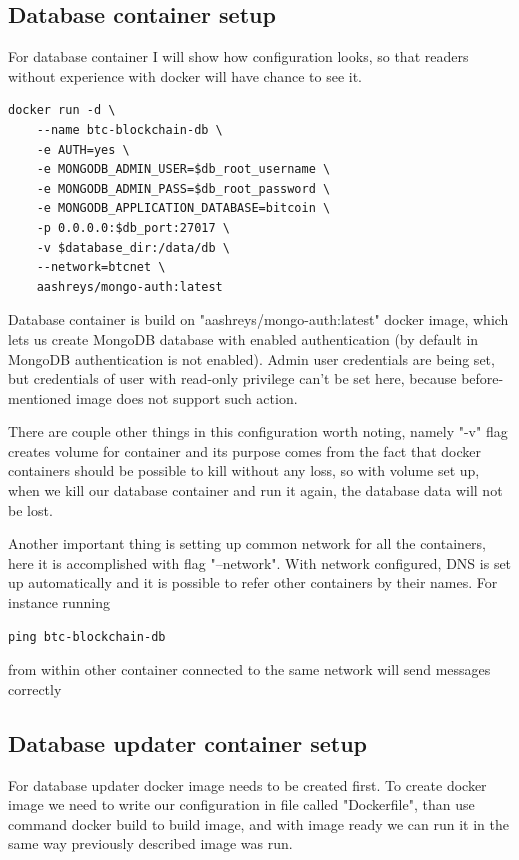 \documentclass[12pt, en, eng, oneside]{mgr}
\begin{document}
\subsection{Database container setup}
For database container I will show how configuration looks, so that readers without experience with docker will have chance to see it.

\begin{verbatim}
docker run -d \
    --name btc-blockchain-db \
    -e AUTH=yes \
    -e MONGODB_ADMIN_USER=$db_root_username \
    -e MONGODB_ADMIN_PASS=$db_root_password \
    -e MONGODB_APPLICATION_DATABASE=bitcoin \
    -p 0.0.0.0:$db_port:27017 \
    -v $database_dir:/data/db \
    --network=btcnet \
    aashreys/mongo-auth:latest
\end{verbatim}

Database container is build on "aashreys/mongo-auth:latest" docker image, which lets us create MongoDB database with enabled authentication (by default in MongoDB authentication is not enabled).
Admin user credentials are being set, but credentials of user with read-only privilege can't be set here, because before-mentioned image does not support such action.

There are couple other things in this configuration worth noting, namely "-v" flag creates volume for container and its purpose comes from the fact that docker containers should be possible to kill without any loss, so with volume set up, when we kill our database container and run it again, the database data will not be lost.

Another important thing is setting up common network for all the containers, here it is accomplished with flag "--network". With network configured, DNS is set up automatically and it is possible to refer other containers by their names. For instance running 
\begin{verbatim}
ping btc-blockchain-db
\end{verbatim}  
from within other container connected to the same network will send messages correctly

\subsection{Database updater container setup}
For database updater docker image needs to be created first. To create docker image we need to write our configuration in file called "Dockerfile", than use command docker build to build image, and with image ready we can run it in the same way previously described image was run.
\end{document}
